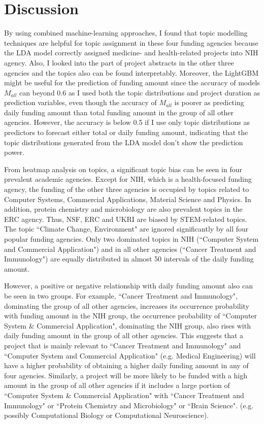 \section{Discussion}

By using combined machine-learning approaches, I found that topic modelling techniques are helpful for topic assignment in these four funding agencies because the LDA model correctly assigned medicine- and health-related projects into NIH agency. Also, I looked into the part of project abstracts in the other three agencies and the topics also can be found interpretably. Moreover, the LightGBM might be useful for the prediction of funding amount since the accuracy of models $M_{all}$ can beyond 0.6 as I used both the topic distributions and project duration as prediction variables, even though the accuracy of $M_{all}$ is poorer as predicting daily funding amount than total funding amount in the group of all other agencies. However, the accuracy is below 0.5 if I use only topic distributions as predictors to forecast either total or daily funding amount, indicating that the topic distributions generated from the LDA model don't show the prediction power.

From heatmap analysis on topics, a significant topic bias can be seen in four prevalent academic agencies. Except for NIH, which is a health-focused funding agency, the funding of the other three agencies is occupied by topics related to Computer Systems, Commercial Applications, Material Science and Physics. In addition, protein chemistry and microbiology are also prevalent topics in the ERC agency. Thus, NSF, ERC and UKRI are biased by STEM-related topics. The topic ``Climate Change, Environment" are ignored significantly by all four popular funding agencies. Only two dominated topics in NIH (``Computer System and Commercial Application") and in all other agencies (``Cancer Treatment and Immunology") are equally distributed in almost 50 intervals of the daily funding amount.

However, a positive or negative relationship with daily funding amount also can be seen in two groups. For example, ``Cancer Treatment and Immunology", dominating the group of all other agencies, increases its occurrence probability with funding amount in the NIH group, the occurrence probability of ``Computer System \& Commercial Application", dominating the NIH group, also rises with daily funding amount in the group of all other agencies. This suggests that a project that is mainly relevant to ``Cancer Treatment and Immunology" and ``Computer System and Commercial Application" (e.g. Medical Engineering) will have a higher probability of obtaining a higher daily funding amount in any of four agencies. Similarly, a project will be more likely to be funded with a high amount in the group of all other agencies if it includes a large portion of ``Computer System \& Commercial Application" with ``Cancer Treatment and Immunology" or ``Protein Chemistry and Microbiology" or ``Brain Science". (e.g. possibly Computational Biology or Computational Neuroscience).

